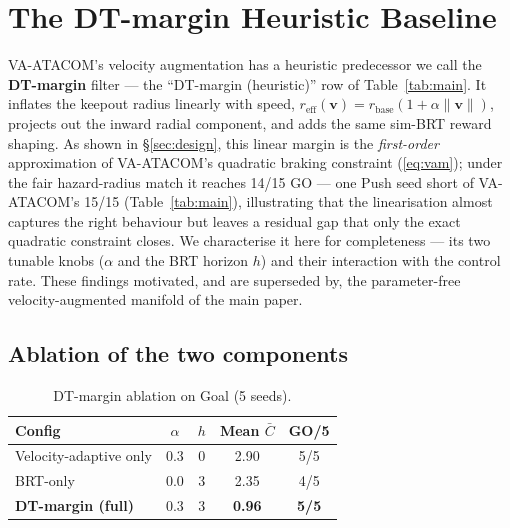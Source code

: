 \documentclass[letterpaper]{article}
\begin{document}
\appendix
\section{The DT-margin Heuristic Baseline}
\label{app:dtmargin}

VA-ATACOM's velocity augmentation has a heuristic predecessor we call the \textbf{DT-margin} filter --- the ``DT-margin (heuristic)'' row of Table~\ref{tab:main}. It inflates the keepout radius linearly with speed, $r_\text{eff}(\boldsymbol{v}) = r_\text{base}(1+\alpha\|\boldsymbol{v}\|)$, projects out the inward radial component, and adds the same sim-BRT reward shaping. As shown in \S\ref{sec:design}, this linear margin is the \emph{first-order} approximation of VA-ATACOM's quadratic braking constraint (\ref{eq:vam}); under the fair hazard-radius match it reaches 14/15 GO --- one Push seed short of VA-ATACOM's 15/15 (Table~\ref{tab:main}), illustrating that the linearisation almost captures the right behaviour but leaves a residual gap that only the exact quadratic constraint closes. We characterise it here for completeness --- its two tunable knobs ($\alpha$ and the BRT horizon $h$) and their interaction with the control rate. These findings motivated, and are superseded by, the parameter-free velocity-augmented manifold of the main paper.

\subsection{Ablation of the two components}

\begin{table}[t]
\centering
\caption{DT-margin ablation on Goal (5 seeds).}
\label{tab:ablation}
\begin{tabular}{lcccc}
\toprule
Config & $\alpha$ & $h$ & Mean $\bar{C}$ & GO/5 \\
\midrule
Velocity-adaptive only & 0.3 & 0 & 2.90 & 5/5 \\
BRT-only & 0.0 & 3 & 2.35 & 4/5 \\
\textbf{DT-margin (full)} & 0.3 & 3 & \textbf{0.96} & \textbf{5/5} \\
\bottomrule
\end{tabular}
\end{table}


\end{document}
